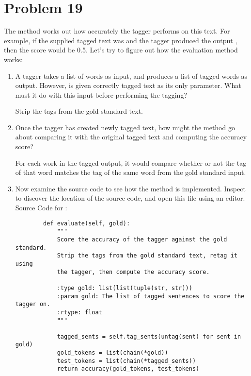 \documentclass[12pt]{article}
\begin{document}
	\section*{Problem 19}
	The  method works out how accurately the tagger performs on this text. For example, if the supplied tagged text was  and the tagger produced the output , then the score would be 0.5. Let's try to figure out how the evaluation method works:
	\begin{enumerate}
		\item A tagger  takes a list of words as input, and produces a list of tagged words as output. However,  is given correctly tagged text as its only parameter. What must it do with this input before performing the tagging?
		
		Strip the tags from the gold standard text.
		
		\item Once the tagger has created newly tagged text, how might the  method go about comparing it with the original tagged text and computing the accuracy score?
		
		For each work in the tagged output, it would compare whether or not the tag of that word matches the tag of the same word from the gold standard input.
		
		\item Now examine the source code to see how the method is implemented. Inspect  to discover the location of the source code, and open this file using an editor.\\
		
		Source Code for :
		\begin{lstlisting}
		def evaluate(self, gold):
			"""
			Score the accuracy of the tagger against the gold standard.
			Strip the tags from the gold standard text, retag it using
			the tagger, then compute the accuracy score.
			
			:type gold: list(list(tuple(str, str)))
			:param gold: The list of tagged sentences to score the tagger on.
			:rtype: float
			"""
			
			tagged_sents = self.tag_sents(untag(sent) for sent in gold)
			gold_tokens = list(chain(*gold))
			test_tokens = list(chain(*tagged_sents))
			return accuracy(gold_tokens, test_tokens)
		\end{lstlisting}
	\end{enumerate}
	
\end{document}
